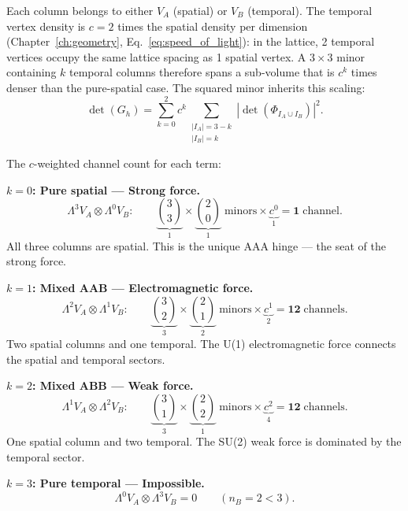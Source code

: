 Each column belongs to either $V_A$ (spatial) or $V_B$ (temporal). The temporal vertex density is $c = 2$ times the spatial density per dimension (Chapter~\ref{ch:geometry}, Eq.~\ref{eq:speed_of_light}): in the lattice, 2 temporal vertices occupy the same lattice spacing as 1 spatial vertex. A $3 \times 3$ minor containing $k$ temporal columns therefore spans a sub-volume that is $c^k$ times denser than the pure-spatial case. The squared minor inherits this scaling:
\begin{equation}
\det(G_h) = \sum_{k=0}^{2} c^k \sum_{\substack{|I_A| = 3-k \\ |I_B| = k}} |\det(\Phi_{I_A \cup I_B})|^2.
\label{eq:BC_expansion}
\end{equation}

The $c$-weighted channel count for each term:

\bigskip

\noindent\textbf{$k = 0$: Pure spatial --- Strong force.}
\begin{equation}
\Lambda^3 V_A \otimes \Lambda^0 V_B: \qquad \underbrace{\binom{3}{3}}_1 \times \underbrace{\binom{2}{0}}_1 \;\text{minors} \times \underbrace{c^0}_1 = \mathbf{1}\;\text{channel}.
\end{equation}
All three columns are spatial. This is the unique AAA hinge --- the seat of the strong force.

\bigskip

\noindent\textbf{$k = 1$: Mixed AAB --- Electromagnetic force.}
\begin{equation}
\Lambda^2 V_A \otimes \Lambda^1 V_B: \qquad \underbrace{\binom{3}{2}}_3 \times \underbrace{\binom{2}{1}}_2 \;\text{minors} \times \underbrace{c^1}_2 = \mathbf{12}\;\text{channels}.
\end{equation}
Two spatial columns and one temporal. The U(1) electromagnetic force connects the spatial and temporal sectors.

\bigskip

\noindent\textbf{$k = 2$: Mixed ABB --- Weak force.}
\begin{equation}
\Lambda^1 V_A \otimes \Lambda^2 V_B: \qquad \underbrace{\binom{3}{1}}_3 \times \underbrace{\binom{2}{2}}_1 \;\text{minors} \times \underbrace{c^2}_4 = \mathbf{12}\;\text{channels}.
\end{equation}
One spatial column and two temporal. The SU(2) weak force is dominated by the temporal sector.

\bigskip

\noindent\textbf{$k = 3$: Pure temporal --- Impossible.}
\begin{equation}
\Lambda^0 V_A \otimes \Lambda^3 V_B = 0 \qquad (n_B = 2 < 3).
\end{equation}

